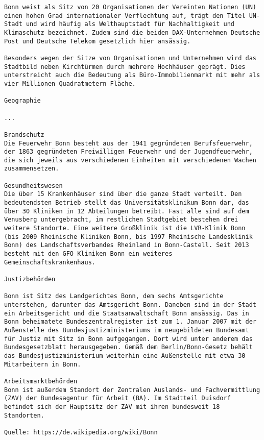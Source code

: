 \documentclass[a4paper,10pt,ngerman]{scrartcl}
\begin{document}
\begin{lstlisting}[frame=tb,breaklines=true]
Bonn weist als Sitz von 20 Organisationen der Vereinten Nationen (UN) einen hohen Grad internationaler Verflechtung auf, trägt den Titel UN-Stadt und wird häufig als Welthauptstadt für Nachhaltigkeit und Klimaschutz bezeichnet. Zudem sind die beiden DAX-Unternehmen Deutsche Post und Deutsche Telekom gesetzlich hier ansässig.

Besonders wegen der Sitze von Organisationen und Unternehmen wird das Stadtbild neben Kirchtürmen durch mehrere Hochhäuser geprägt. Dies unterstreicht auch die Bedeutung als Büro-Immobilienmarkt mit mehr als vier Millionen Quadratmetern Fläche.

Geographie

...

Brandschutz
Die Feuerwehr Bonn besteht aus der 1941 gegründeten Berufsfeuerwehr, der 1863 gegründeten Freiwilligen Feuerwehr und der Jugendfeuerwehr, die sich jeweils aus verschiedenen Einheiten mit verschiedenen Wachen zusammensetzen.

Gesundheitswesen
Die über 15 Krankenhäuser sind über die ganze Stadt verteilt. Den bedeutendsten Betrieb stellt das Universitätsklinikum Bonn dar, das über 30 Kliniken in 12 Abteilungen betreibt. Fast alle sind auf dem Venusberg untergebracht, im restlichen Stadtgebiet bestehen drei weitere Standorte. Eine weitere Großklinik ist die LVR-Klinik Bonn (bis 2009 Rheinische Kliniken Bonn, bis 1997 Rheinische Landesklinik Bonn) des Landschaftsverbandes Rheinland in Bonn-Castell. Seit 2013 besteht mit den GFO Kliniken Bonn ein weiteres Gemeinschaftskrankenhaus.

Justizbehörden

Bonn ist Sitz des Landgerichtes Bonn, dem sechs Amtsgerichte unterstehen, darunter das Amtsgericht Bonn. Daneben sind in der Stadt ein Arbeitsgericht und die Staatsanwaltschaft Bonn ansässig. Das in Bonn beheimatete Bundeszentralregister ist zum 1. Januar 2007 mit der Außenstelle des Bundesjustizministeriums im neugebildeten Bundesamt für Justiz mit Sitz in Bonn aufgegangen. Dort wird unter anderem das Bundesgesetzblatt herausgegeben. Gemäß dem Berlin/Bonn-Gesetz behält das Bundesjustizministerium weiterhin eine Außenstelle mit etwa 30 Mitarbeitern in Bonn.

Arbeitsmarktbehörden
Bonn ist außerdem Standort der Zentralen Auslands- und Fachvermittlung (ZAV) der Bundesagentur für Arbeit (BA). Im Stadtteil Duisdorf befindet sich der Hauptsitz der ZAV mit ihren bundesweit 18 Standorten.

Quelle: https://de.wikipedia.org/wiki/Bonn
\end{lstlisting}
\end{document}
